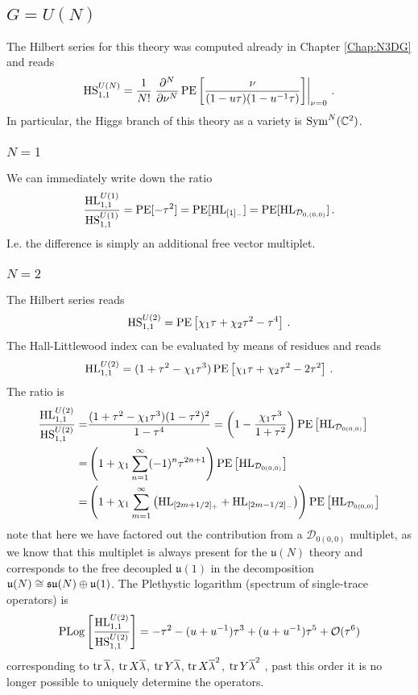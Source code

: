 \documentclass[main.tex]{subfiles}
\begin{document}
\subsection{\texorpdfstring{$G=U(N)$}{G=U(N)}}
The Hilbert series for this theory was computed already in Chapter \ref{Chap:N3DG} and reads
\begin{equation}
\textrm{HS}^{U(N)}_{1,1}=\frac{1}{N!}\left.\frac{\partial^N}{\partial\nu^N}\operatorname{\mathrm{PE}}\left[\frac{\nu}{(1-u\tau)(1-u^{-1}\tau)}\right]\right|_{\nu=0}\,.
\end{equation}
In particular, the Higgs branch of this theory as a variety is $\operatorname{Sym}^N(\mathbb{C}^2)$.

\subsubsection{$N=1$}
We can immediately write down the ratio
\begin{equation}
\frac{\textrm{HL}^{U(1)}_{1,1}}{\textrm{HS}^{U(1)}_{1,1}}=\operatorname{\mathrm{PE}}[-\tau^2]=\operatorname{\mathrm{PE}}[\textrm{HL}_{[1]_-}]=\operatorname{\mathrm{PE}}[\textrm{HL}_{\mathcal{D}_{0,(0,0)}}]\,.
\end{equation}
I.e. the difference is simply an additional free vector multiplet. 
\subsubsection{$N=2$}
The Hilbert series reads
\begin{equation}
\textrm{HS}^{U(2)}_{1,1}=\operatorname{\mathrm{PE}}\left[\chi_1\tau+\chi_2\tau^2-\tau^4 \right]\,.
\end{equation}
The Hall-Littlewood index can be evaluated by means of residues and reads
\begin{equation}
\textrm{HL}^{U(2)}_{1,1}=(1+\tau^2-\chi_1\tau^3)\operatorname{\mathrm{PE}}\left[\chi_1\tau+\chi_2\tau^2-2\tau^2\right]\,.
\end{equation}
The ratio is
\begin{align}
\frac{\textrm{HL}^{U(2)}_{1,1}}{\textrm{HS}^{U(2)}_{1,1}}=&\frac{(1+\tau^2-\chi_1\tau^3)(1-\tau^2)^2}{1-\tau^4}=\left(1-\frac{\chi_1\tau^3}{1+\tau^2}\right)\operatorname{\mathrm{PE}}\left[\textrm{HL}_{\mathcal{D}_{0(0,0)}}\right]\\
=&\left(1+\chi_1\sum_{n=1}^{\infty}(-1)^{n}\tau^{2n+1}\right)\operatorname{\mathrm{PE}}\left[\textrm{HL}_{\mathcal{D}_{0(0,0)}}\right]\\
=&\left(1+\chi_1\sum_{m=1}^{\infty}\left(\textrm{HL}_{[2m+1/2]_+}+\textrm{HL}_{[2m-1/2]_-}\right)\right)\operatorname{\mathrm{PE}}\left[\textrm{HL}_{\mathcal{D}_{0(0,0)}}\right]
\end{align}
note that here we have factored out the contribution from a $\mathcal{D}_{0(0,0)}$ multiplet, as we know that this multiplet is always present for the $\mathfrak{u}(N)$ theory and corresponds to the free decoupled $\mathfrak{u}(1)$ in the decomposition $\mathfrak{u}(N)\cong\mathfrak{su}(N)\oplus\mathfrak{u}(1)$.
The Plethystic logarithm (spectrum of single-trace operators) is
\begin{equation}
\operatorname{\mathrm{PLog}}\left[\frac{\textrm{HL}^{U(2)}_{1,1}}{\textrm{HS}^{U(2)}_{1,1}}\right]=-\tau^2-(u+u^{-1})\tau^3+(u+u^{-1})\tau^5+\mathcal{O}(\tau^6)
\end{equation}
corresponding to $\operatorname{tr}\overline{\lambda}$, $\operatorname{tr} X\overline{\lambda}$, $\operatorname{tr} Y\overline{\lambda}$, $\operatorname{tr} X\overline{\lambda}^2$, $\operatorname{tr} Y\overline{\lambda}^2$ , past this order it is no longer possible to uniquely determine the operators.
\end{document}
